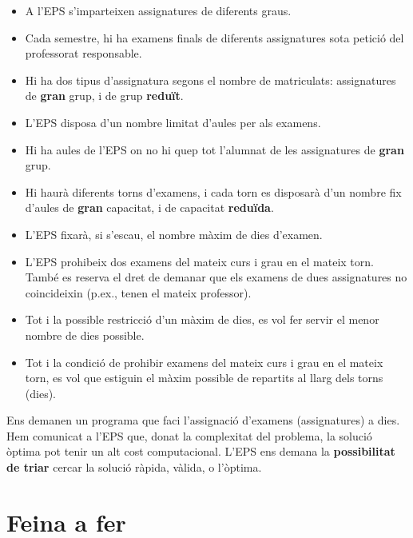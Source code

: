 \documentclass[10pt,a4paper]{../documents/class_material_assignatura_udg}
\begin{document}
\begin{itemize}
\item A l'EPS s'imparteixen assignatures de diferents graus.
\item Cada semestre, hi ha examens finals de diferents assignatures sota petició del professorat responsable.
\item Hi ha dos tipus d'assignatura segons el nombre de matriculats: assignatures de {\bf\textcolor{salmo}{g}ran} grup, i de grup {\bf\textcolor{salmo}{r}eduït}.
\item L'EPS disposa d'un nombre limitat d'aules per als examens.
\item Hi ha aules de l'EPS on no hi quep tot l'alumnat de les assignatures de {\bf\textcolor{salmo}{g}ran} grup.
\item Hi haurà diferents torns d'examens, i cada torn es disposarà d'un nombre fix d'aules de {\bf\textcolor{salmo}{g}ran} capacitat, i de capacitat {\bf\textcolor{salmo}{r}eduïda}.
\item L'EPS fixarà, si s'escau, el nombre màxim de dies d'examen.
\item L'EPS prohibeix dos examens del mateix curs i grau en el mateix torn. També es reserva el dret de demanar que els examens de dues assignatures no coincideixin (p.ex., tenen el mateix professor).\\[-2pt]

\item Tot i la possible restricció d'un màxim de dies, es vol fer servir el menor nombre de dies possible.
\item Tot i la condició de prohibir examens del mateix curs i grau en el mateix torn, es vol que estiguin el màxim possible de repartits al llarg dels torns (dies).  
\end{itemize}

Ens demanen un programa que faci l'assignació d'examens (assignatures) a dies. Hem comunicat a l'EPS que, donat la complexitat del problema, la solució òptima pot tenir un alt cost computacional. L'EPS ens demana la \textbf{possibilitat de triar} cercar la solució ràpida, vàlida, o l'òptima.

\section{Feina a fer}
\end{document}
